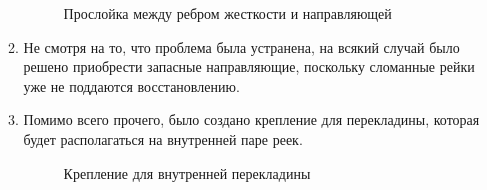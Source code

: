 \begin{enumerate}
\begin{enumerate}
      \begin{figure}[H]
      	\begin{minipage}[h]{1\linewidth}
      		\caption{Прослойка между ребром жесткости и направляющей}
      	\end{minipage}
      \end{figure}
      
      \item Не смотря на то, что проблема была устранена, на всякий случай было решено приобрести запасные направляющие, поскольку сломанные рейки уже не поддаются восстановлению.
      
      \item Помимо всего прочего, было создано крепление для перекладины, которая будет располагаться на внутренней паре реек.
      
      \begin{figure}[H]
      	\begin{minipage}[h]{1\linewidth}
      		\caption{Крепление для внутренней перекладины}
      	\end{minipage}
      \end{figure}
      

\end{enumerate}
\end{enumerate}
